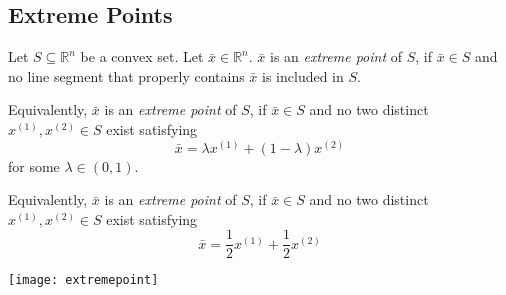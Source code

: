 \subsection{Extreme Points}

\begin{defbox}
    \begin{definition}
        Let $ S\subseteq \mathbb{R}^n $ be a convex set.
        Let $ \bar{x}\in\mathbb{R}^n $.
        $ \bar{x} $ is an \emph{extreme point} of $ S $, if $ \bar{x}\in S $ and
        no line segment that properly contains $ \bar{x} $ is included
        in $ S $.

        Equivalently, $ \bar{x} $ is an \emph{extreme point} of $ S $, if
        $ \bar{x}\in S $ and no two distinct $ x^{(1)},x^{(2)}\in S $ exist satisfying
        \[ \bar{x}=\lambda x^{(1)} + (1-\lambda)x^{(2)} \]
        for some $ \lambda\in (0,1) $.

        Equivalently, $ \bar{x} $ is an \emph{extreme point} of $ S $, if
        $ \bar{x}\in S $ and no two distinct $ x^{(1)},x^{(2)}\in S $ exist satisfying
        \[ \bar{x}=\frac{1}{2} x^{(1)} + \frac{1}{2} x^{(2)} \]
    \end{definition}
\end{defbox}

\begin{center}
    \texttt{[image: extremepoint]}
\end{center}
